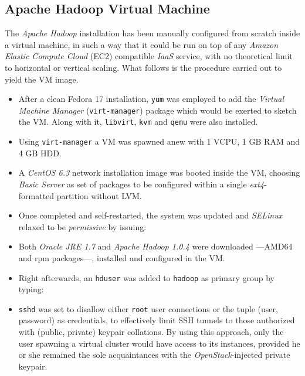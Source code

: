 \documentclass{sig-alternate}
\begin{document}
\subsection{Apache Hadoop Virtual Machine}
The \emph{Apache Hadoop} installation has been manually configured from scratch inside a virtual machine, in such a way that it could be run on top of any \emph{Amazon Elastic Compute Cloud} (EC2) compatible \emph{IaaS} service, with no theoretical limit to horizontal or vertical scaling. What follows is the procedure carried out to yield the VM image.

\begin{itemize}
 \item After a clean Fedora 17 installation, \texttt{yum} was employed to add the \emph{Virtual Machine Manager} (\texttt{virt-manager}) package which would be exerted to sketch the VM. Along with it, \texttt{libvirt}, \texttt{kvm} and \texttt{qemu} were also installed.
 \item Using \texttt{virt-manager} a VM was spawned anew with 1 VCPU, 1 GB RAM and 4 GB HDD.
 \item A \emph{CentOS 6.3} network installation image was booted inside the VM, choosing \emph{Basic Server} as set of packages to be configured within a single \emph{ext4}-formatted partition without LVM.
 \item Once completed and self-restarted, the system was updated and \emph{SELinux} relaxed to be \emph{permissive} by issuing:
 
 
 \item Both \emph{Oracle JRE 1.7} and \emph{Apache Hadoop 1.0.4} were downloaded ---AMD64 and rpm packages---, installed and configured in the VM.
 \item Right afterwards, an \texttt{hduser} was added to \texttt{hadoop} as primary group by typing:
 
 
 \item \texttt{sshd} was set to disallow either \texttt{root} user connections or the tuple (user, password) as credentials, to effectively limit SSH tunnels to those authorized with (public, private) keypair collations. By using this approach, only the user spawning a virtual cluster would have access to its instances, provided he or she remained the sole acquaintances with the \emph{OpenStack}-injected private keypair.
 

\end{itemize}
\end{document}
